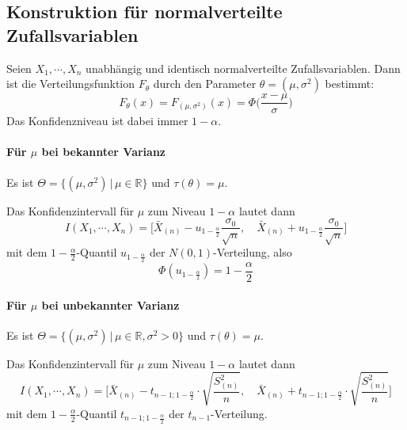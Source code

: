 \documentclass[a4paper, 11pt, accentcolor = tud3b]{tudreport}
\newcommand{\forwhich}{\ensuremath{{\,\vert\,}}}
\newcommand{\R}{\ensuremath{\mathbb{R}}}
\begin{document}
	        \subsection{Konstruktion für normalverteilte Zufallsvariablen}
	            Seien \(X_1, \cdots, X_n\) unabhängig und identisch normalverteilte Zufallsvariablen. Dann ist die Verteilungsfunktion \(F_\theta\) durch den Parameter \( \theta = (\mu, \sigma^2) \) bestimmt:
	            \begin{equation*}
		            F_\theta(x) = F_{(\mu, \sigma^2)}(x) = \Phi\bigg(\frac{x - \mu}{\sigma}\bigg)
	            \end{equation*}
	            Das Konfidenzniveau ist dabei immer \( 1 - \alpha \).
	
	            \paragraph{Für \(\mu\) bei bekannter Varianz}
	                Es ist \( \Theta = \{ (\mu, \sigma^2) \forwhich \mu \in \R \} \) und \( \tau(\theta) = \mu \).
	                
	                Das Konfidenzintervall für \(\mu\) zum Niveau \( 1 - \alpha \) lautet dann
	                \begin{equation*}
		                I(X_1, \cdots, X_n) = \Bigg[ \bar{X}_{(n)} - u_{1 - \frac{\alpha}{2}} \frac{\sigma_0}{\sqrt{n}}, \quad \bar{X}_{(n)} + u_{1 - \frac{\alpha}{2}} \frac{\sigma_0}{\sqrt{n}} \Bigg]
	                \end{equation*}
	                mit dem \( 1 - \frac{\alpha}{2} \)-Quantil \( u_{ 1 - \frac{\alpha}{2} } \) der \( N(0, 1) \)-Verteilung, also
	                \begin{equation*}
		                \Phi(u_{ 1 - \frac{\alpha}{2} }) = 1 - \frac{\alpha}{2}
	                \end{equation*}
	
	            \paragraph{Für \(\mu\) bei unbekannter Varianz}
	                Es ist \( \Theta = \{ (\mu, \sigma^2) \forwhich \mu \in \R, \sigma^2 > 0 \} \) und \( \tau(\theta) = \mu \).
	                
	                Das Konfidenzintervall für \(\mu\) zum Niveau \( 1 - \alpha \) lautet dann
	                \begin{equation*}
		                I(X_1, \cdots, X_n) = \Bigg[ \bar{X}_{(n)} - t_{ n - 1; 1 - \frac{\alpha}{2} } \cdot \sqrt{\frac{S_{(n)}^2}{n}}, \quad \bar{X}_{(n)} + t_{ n - 1; 1 - \frac{\alpha}{2} } \cdot \sqrt{\frac{S_{(n)}^2}{n}} \Bigg]
	                \end{equation*}
	                mit dem \( 1 - \frac{\alpha}{2} \)-Quantil \( t_{ n - 1; 1 - \frac{\alpha}{2} } \) der \( t_{n-1} \)-Verteilung.
	
\end{document}
